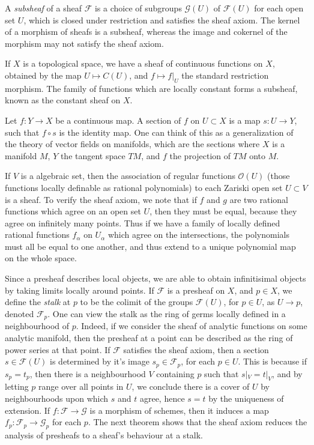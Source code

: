 A \emph{subsheaf} of a sheaf $\mathcal{F}$ is a choice of subgroups $\mathcal{G}(U)$ of $\mathcal{F}(U)$ for each open set $U$, which is closed under restriction and satisfies the sheaf axiom. The kernel of a morphism of sheafs is a subsheaf, whereas the image and cokernel of the morphism may not satisfy the sheaf axiom.

\begin{example}
    If $X$ is a topological space, we have a sheaf of continuous functions on $X$, obtained by the map $U \mapsto C(U)$, and $f \mapsto f|_U$ the standard restriction morphism. The family of functions which are locally constant forms a subsheaf, known as the constant sheaf on $X$.
\end{example}

\begin{example}
    Let $f: Y \to X$ be a continuous map. A section of $f$ on $U \subset X$ is a map $s: U \to Y$, such that $f \circ s$ is the identity map. One can think of this as a generalization of the theory of vector fields on manifolds, which are the sections where $X$ is a manifold $M$, $Y$ the tangent space $TM$, and $f$ the projection of $TM$ onto $M$.
\end{example}

\begin{example}
    If $V$ is a algebraic set, then the association of regular functions $\mathcal{O}(U)$ (those functions locally definable as rational polynomials) to each Zariski open set $U \subset V$ is a sheaf. To verify the sheaf axiom, we note that if $f$ and $g$ are two rational functions which agree on an open set $U$, then they must be equal, because they agree on infinitely many points. Thus if we have a family of locally defined rational functions $f_\alpha$ on $U_\alpha$ which agree on the intersections, the polynomials must all be equal to one another, and thus extend to a unique polynomial map on the whole space.
\end{example}

Since a presheaf describes local objects, we are able to obtain infinitisimal objects by taking limits locally around points. If $\mathcal{F}$ is a presheaf on $X$, and $p \in X$, we define the \emph{stalk} at $p$ to be the colimit of the groups $\mathcal{F}(U)$, for $p \in U$, as $U \to p$, denoted $\mathcal{F}_p$. One can view the stalk as the ring of germs locally defined in a neighbourhood of $p$. Indeed, if we consider the sheaf of analytic functions on some analytic manifold, then the presheaf at a point can be described as the ring of power series at that point. If $\mathcal{F}$ satisfies the sheaf axiom, then a section $s \in \mathcal{F}(U)$ is determined by it's image $s_p \in \mathcal{F}_p$, for each $p \in U$. This is because if $s_p = t_p$, then there is a neighbourhood $V$ containing $p$ such that $s|_V = t|_V$, and by letting $p$ range over all points in $U$, we conclude there is a cover of $U$ by neighbourhoods upon which $s$ and $t$ agree, hence $s = t$ by the uniqueness of extension. If $f: \mathcal{F} \to \mathcal{G}$ is a morphism of schemes, then it induces a map $f_p: \mathcal{F}_p \to \mathcal{G}_p$ for each $p$. The next theorem shows that the sheaf axiom reduces the analysis of presheafs to a sheaf's behaviour at a stalk.

